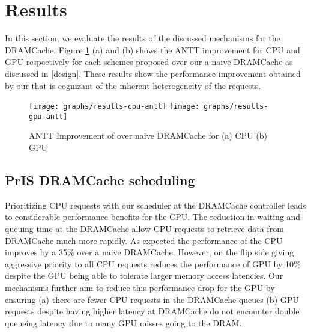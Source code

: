 \section{Results} \label{results}
In this section, we evaluate the results of the discussed mechanisms for the DRAMCache. Figure \ref{results-antt-graph} (a) and (b) shows the ANTT improvement for CPU and GPU respectively for each schemes proposed over our a naive DRAMCache as discussed in \ref{design}. These results show the performance improvement obtained by our \cachename that is cognizant of the inherent heterogeneity of the requests.
\begin{figure}[!htb]
    \centering
    \texttt{[image: graphs/results-cpu-antt]}
    \texttt{[image: graphs/results-gpu-antt]}
    \caption{ANTT Improvement of \cachename over naive DRAMCache for (a) CPU (b) GPU}
    \label{results-antt-graph}
\end{figure}

\subsection{PrIS DRAMCache scheduling}
Prioritizing CPU requests with our \prioname scheduler at the DRAMCache controller leads to considerable performance benefits for the CPU. The reduction in waiting and queuing time at the DRAMCache allow CPU requests to retrieve data from DRAMCache much more rapidly. As expected the performance of the CPU improves by a 35\% over a naive DRAMCache. However, on the flip side giving aggressive priority to all CPU requests reduces the performance of GPU by 10\% despite the GPU being able to tolerate larger memory access latencies. Our mechanisms further aim to reduce this performance drop for the GPU by ensuring (a) there are fewer CPU requests in the DRAMCache queues (b) GPU requests despite having higher latency at DRAMCache do not encounter double queueing latency due to many GPU misses going to the DRAM.
